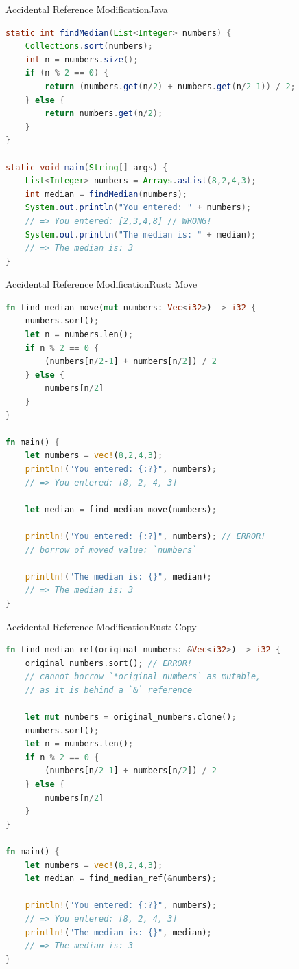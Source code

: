 \begin{Frame}[fragile]{Accidental Reference Modification}{Java}
\begin{lstlisting}[language=Java]
static int findMedian(List<Integer> numbers) {
    Collections.sort(numbers);
    int n = numbers.size();
    if (n % 2 == 0) {
        return (numbers.get(n/2) + numbers.get(n/2-1)) / 2;
    } else {
        return numbers.get(n/2);
    }
}

static void main(String[] args) {
    List<Integer> numbers = Arrays.asList(8,2,4,3);
    int median = findMedian(numbers);
    System.out.println("You entered: " + numbers);
    // => You entered: [2,3,4,8] // WRONG!
    System.out.println("The median is: " + median);
    // => The median is: 3
}
\end{lstlisting}
\end{Frame}

\begin{Frame}[fragile]{Accidental Reference Modification}{Rust: Move}
\begin{lstlisting}[language=Rust]
fn find_median_move(mut numbers: Vec<i32>) -> i32 {
    numbers.sort();
    let n = numbers.len();
    if n % 2 == 0 {
        (numbers[n/2-1] + numbers[n/2]) / 2
    } else {
        numbers[n/2]
    }
}

fn main() {
    let numbers = vec!(8,2,4,3);
    println!("You entered: {:?}", numbers);
    // => You entered: [8, 2, 4, 3]
    
    let median = find_median_move(numbers);
    
    println!("You entered: {:?}", numbers); // ERROR!
    // borrow of moved value: `numbers`

    println!("The median is: {}", median);
    // => The median is: 3
}
\end{lstlisting}
\end{Frame}

\begin{Frame}[fragile]{Accidental Reference Modification}{Rust: Copy}
\begin{lstlisting}[language=Rust]
fn find_median_ref(original_numbers: &Vec<i32>) -> i32 {
    original_numbers.sort(); // ERROR!
    // cannot borrow `*original_numbers` as mutable,
    // as it is behind a `&` reference
    
    let mut numbers = original_numbers.clone();
    numbers.sort();
    let n = numbers.len();
    if n % 2 == 0 {
        (numbers[n/2-1] + numbers[n/2]) / 2
    } else {
        numbers[n/2]
    }
}

fn main() {
    let numbers = vec!(8,2,4,3);
    let median = find_median_ref(&numbers);
    
    println!("You entered: {:?}", numbers);
    // => You entered: [8, 2, 4, 3]
    println!("The median is: {}", median);
    // => The median is: 3
}
\end{lstlisting}
\end{Frame}

